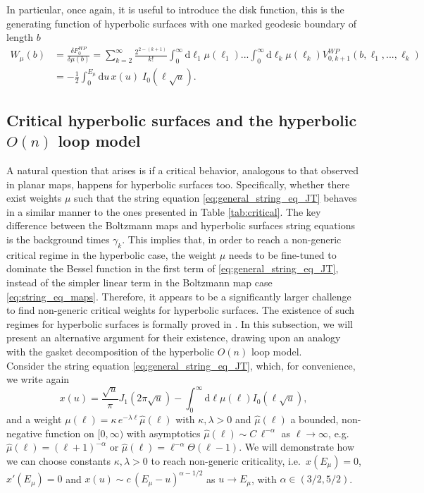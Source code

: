 \documentclass[a4paper,11pt]{article}
\newcommand{\rmd}{\mathrm{d}}
\begin{document}
In particular, once again, it is useful to introduce the disk function, this is the generating function of hyperbolic surfaces with one marked geodesic boundary of length $b$
\begin{align}
W_\mu(b) &=\frac{\delta F^{WP}
_0}{\delta\mu(b)}=\sum_{k=2}^\infty\frac{2^{2-(k+1)}}{k!}\int_0^\infty \rmd \ell_1
\mu(\ell_1)...\int_0^\infty \rmd \ell_k
\mu(\ell_k)V^{WP}_{0,k+1}(b,\ell_1,...,\ell_k)\\
   &= -\frac{1}{2}\int_{0}^{E_\mu} \!\!\!\rmd u\, x(u)\;I_0(\ell\sqrt{u}).\label{eq:JT_disk_function}
\end{align}
\subsection{Critical hyperbolic surfaces and the hyperbolic $O(n)$ loop model}\label{subsection:hyp_o(n)}
A natural question that arises is if a critical behavior, analogous to that observed in planar maps, happens for hyperbolic surfaces too. Specifically, whether there exist weights $\mu$ such that the string equation \eqref{eq:general_string_eq_JT} behaves in a similar manner to the ones presented in Table \ref{tab:critical}. The key difference between the Boltzmann maps and hyperbolic surfaces string equations is the background times $\gamma_k$. This implies that, in order to reach a non-generic critical regime in the hyperbolic case, the weight $\mu$ needs to be fine-tuned to dominate the Bessel function in the first term of \eqref{eq:general_string_eq_JT}, instead of the simpler linear term in the Boltzmann map case \eqref{eq:string_eq_maps}. Therefore, it appears to be a significantly larger challenge to find non-generic critical weights for hyperbolic surfaces. The existence of such regimes for hyperbolic surfaces is formally proved in \cite{budd2023}.  In this subsection, we will present an alternative argument for their existence, drawing upon an analogy with the gasket decomposition of the hyperbolic $O(n)$ loop model.\\
Consider the string equation \eqref{eq:general_string_eq_JT}, which, for convenience, we write again 
\begin{equation*}
 x(u)=\frac{\sqrt{u}}{\pi}J_1\left(2\pi\sqrt{u}\right)-\int_0^\infty \rmd\ell \mu(\ell) I_0\left(\ell \sqrt{u}\right),    
\end{equation*}
and a weight $\mu(\ell) = \kappa \,e^{-\lambda\ell} \hat{\mu}(\ell)$ with $\kappa,\lambda>0$ and $\hat{\mu}(\ell)$ a bounded, non-negative function on $[0,\infty)$ with asymptotics $\hat{\mu}(\ell) \sim C \,\ell^{-\alpha}$ as $\ell\to\infty$, e.g.\ $\hat{\mu}(\ell) = (\ell+1)^{-\alpha}$ or $\hat{\mu}(\ell) = \ell^{-\alpha} \Theta(\ell-1)$. We will demonstrate how we can choose constants $\kappa,\lambda>0$ to reach non-generic criticality, i.e.\ $x(E_\mu)=0$, $x'(E_\mu)=0$ and $x(u) \sim c\, (E_\mu-u)^{\alpha-1/2}$ as $u\to E_\mu$, with $\alpha \in (3/2,5/2)$.
\end{document}
